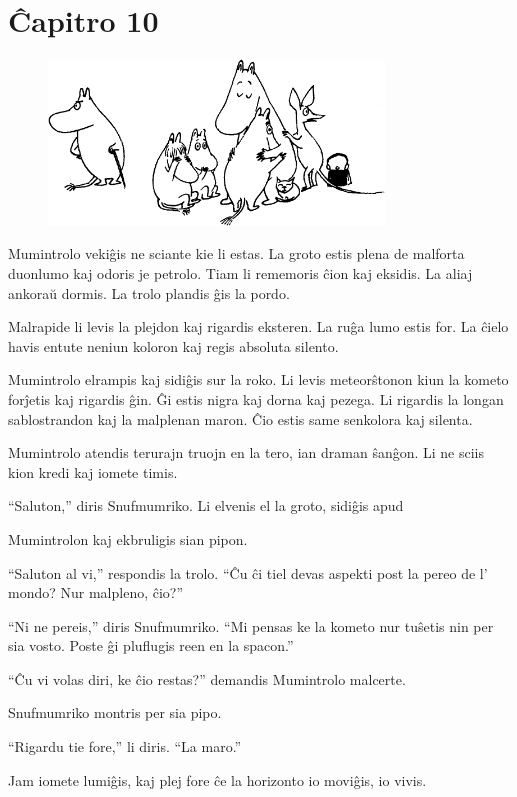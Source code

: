 \chapter[Ĉapitro 10]{Ĉapitro 10}

\begin{figure}[htbp]
\centering
\includegraphics[width=253pt,height=125pt]{10-1.png}
\caption{}
\label{10-1}
\end{figure}

Mumintrolo vekiĝis ne sciante kie li estas. La groto estis plena de malforta duonlumo kaj odoris je petrolo. Tiam li rememoris ĉion kaj eksidis. La aliaj ankoraŭ dormis. La trolo plandis ĝis la pordo.

Malrapide li levis la plejdon kaj rigardis eksteren. La ruĝa lumo estis for. La ĉielo havis entute neniun koloron kaj regis absoluta silento.

Mumintrolo elrampis kaj sidiĝis sur la roko. Li levis meteorŝtonon kiun la kometo forĵetis kaj rigardis ĝin. Ĝi estis nigra kaj dorna kaj pezega. Li rigardis la longan sablostrandon kaj la malplenan maron. Ĉio estis same senkolora kaj silenta.

Mumintrolo atendis terurajn truojn en la tero, ian draman ŝanĝon. Li ne sciis kion kredi kaj iomete timis.

``Saluton,'' diris Snufmumriko. Li elvenis el la groto, sidiĝis apud

Mumintrolon kaj ekbruligis sian pipon.

``Saluton al vi,'' respondis la trolo. ``Ĉu ĉi tiel devas aspekti post la pereo de l' mondo? Nur malpleno, ĉio?''

``Ni ne pereis,'' diris Snufmumriko. ``Mi pensas ke la kometo nur tuŝetis nin per sia vosto. Poste ĝi pluflugis reen en la spacon.''

``Ĉu vi volas diri, ke ĉio restas?'' demandis Mumintrolo malcerte.

Snufmumriko montris per sia pipo.

``Rigardu tie fore,'' li diris. ``La maro.''

Jam iomete lumiĝis, kaj plej fore ĉe la horizonto io moviĝis, io vivis.

